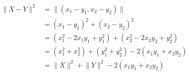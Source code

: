 \documentclass[preview]{standalone}
\begin{document}
\begin{align*}
\lVert X-Y \rVert ^{2}& = \lVert (x_{1}-y_{1},x_{2}-y_{2}) \rVert \\ & =(x_{1}-y_{1})^2 + (x_{2}-y_{2})^2 \\ & =(x_{1}^2 - 2x_{1}y_{1}+ y_{1}^2)+(x_{2}^2 - 2x_{2}y_{2}+ y_{2}^2) \\ & =(x_{1}^2+x_{2}^2)+(y_{1}^2+y_{2}^2) -2(x_{1}y_{1}+x_{2}y_{2}) \\ & = \lVert X \rVert ^{2} + \lVert Y \rVert ^{2} -2(x_{1}y_{1}+x_{2}y_{2})
\end{align*}
\end{document}
